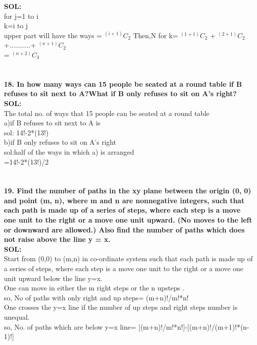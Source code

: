 \documentclass[8pt,a4paper]{article}
\begin{document}
\textbf{SOL:}\\for j=1 to i\\ k=i to j \\ upper part will have the ways = $^(i+1)C_2 $ Then,N for k= $^(1+1)C_2$ + $^(2+1)C_2$ +...........+ $^(n+1)C_2$ \\ = $^(n+2)C_3$\\


\section{}

\textbf{18. In how many ways can 15 people be seated at a round table if B refuses to sit next to
A?What if B only refuses to sit on A's right?}\\

\textbf{SOL:}\\ The total no. of ways that 15 people can  be seated at a round table \\
      a)if B refuses to sit next to A is \\
       sol: 14!-2*(13!) \\
       b)if B only refuses to sit on A’s right\\
        sol:half of the ways in which  a) is arranged\\
				={14!-2*(13!)}/2\\


\section{}

\textbf{19. Find the number of paths in the xy plane between the origin (0, 0) and point (m, n),
where m and n are nonnegative integers, such that each path is made up of a series of
steps, where each step is a move one unit to the right or a move one unit upward. (No
moves to the left or downward are allowed.) Also find the number of paths which does
not raise above the line y = x.}\\

\textbf{SOL:}\\Start from (0,0) to (m,n) in co-ordinate system such that each path is made up of a series of steps, where each step is a move one unit to the right or a move one unit upward below the line y=x.\\One can move in either the m right steps or the n upsteps .\\so,
 No of paths with only right and up steps= (m+n)!/m!*n!\\ One crosses the y=x line if the number of up steps and right steps number is unequal.\\ so, No. of paths which are below y=x line= [(m+n)!/m!*n!]-[(m+n)!/(m+1)!*(n-1)!]
\end{document}
